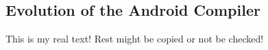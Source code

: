 \subsection{Evolution of the Android Compiler} \label{subsection:android-evolution}
This is my real text! Rest might be copied or not be checked!
